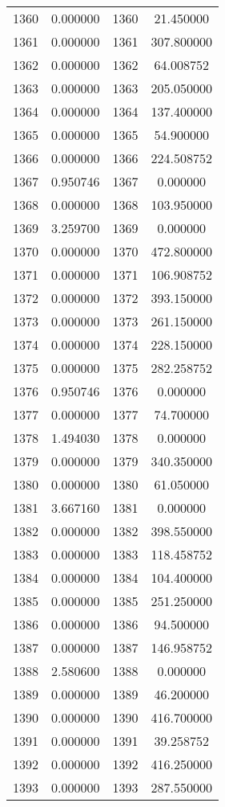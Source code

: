 \documentclass[12pt]{article}
\begin{document}
\begin{longtable}{@{}cccc@{}}
1360 & 0.000000 & 1360 & 21.450000 \\
1361 & 0.000000 & 1361 & 307.800000 \\
1362 & 0.000000 & 1362 & 64.008752 \\
1363 & 0.000000 & 1363 & 205.050000 \\
1364 & 0.000000 & 1364 & 137.400000 \\
1365 & 0.000000 & 1365 & 54.900000 \\
1366 & 0.000000 & 1366 & 224.508752 \\
1367 & 0.950746 & 1367 & 0.000000 \\
1368 & 0.000000 & 1368 & 103.950000 \\
1369 & 3.259700 & 1369 & 0.000000 \\
1370 & 0.000000 & 1370 & 472.800000 \\
1371 & 0.000000 & 1371 & 106.908752 \\
1372 & 0.000000 & 1372 & 393.150000 \\
1373 & 0.000000 & 1373 & 261.150000 \\
1374 & 0.000000 & 1374 & 228.150000 \\
1375 & 0.000000 & 1375 & 282.258752 \\
1376 & 0.950746 & 1376 & 0.000000 \\
1377 & 0.000000 & 1377 & 74.700000 \\
1378 & 1.494030 & 1378 & 0.000000 \\
1379 & 0.000000 & 1379 & 340.350000 \\
1380 & 0.000000 & 1380 & 61.050000 \\
1381 & 3.667160 & 1381 & 0.000000 \\
1382 & 0.000000 & 1382 & 398.550000 \\
1383 & 0.000000 & 1383 & 118.458752 \\
1384 & 0.000000 & 1384 & 104.400000 \\
1385 & 0.000000 & 1385 & 251.250000 \\
1386 & 0.000000 & 1386 & 94.500000 \\
1387 & 0.000000 & 1387 & 146.958752 \\
1388 & 2.580600 & 1388 & 0.000000 \\
1389 & 0.000000 & 1389 & 46.200000 \\
1390 & 0.000000 & 1390 & 416.700000 \\
1391 & 0.000000 & 1391 & 39.258752 \\
1392 & 0.000000 & 1392 & 416.250000 \\
1393 & 0.000000 & 1393 & 287.550000 \\

\end{longtable}
\end{document}
